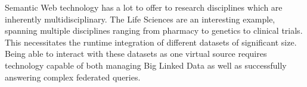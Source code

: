 Semantic Web technology has a lot to offer to research disciplines which are inherently multidisciplinary. The Life Sciences are an interesting example, spanning multiple disciplines ranging from pharmacy to genetics to clinical trials.
This necessitates the runtime integration of different datasets of significant size. 
Being able to interact with these datasets as one virtual source requires technology capable of both managing Big Linked Data as well as successfully answering complex federated queries.

